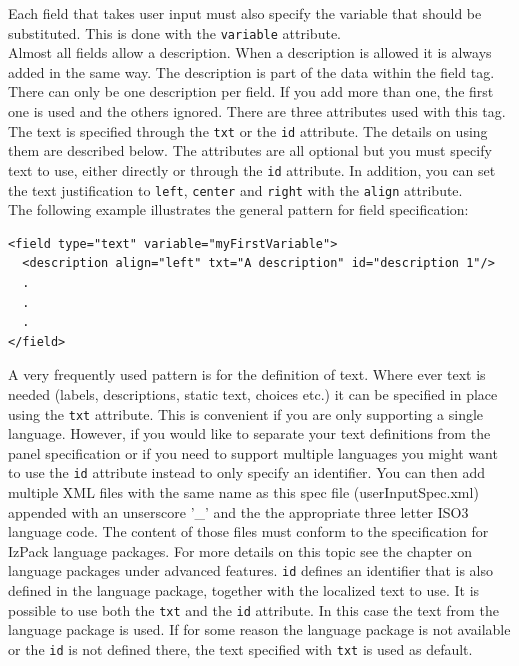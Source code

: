 Each field that takes user input must also specify the variable that
should be substituted. This is done with the \texttt{variable}
attribute.\\

\label{userInput:descriptiontag}
Almost all fields allow a description. When a description is allowed it
is always added in the same way. The description is part of the data
within the field tag. There can only be one description per field. If
you add more than one, the first one is used and the others ignored.
There are three attributes used with this tag. The text is specified
through the \texttt{txt} or the \texttt{id} attribute. The details on
using them are described below. The attributes are all optional but you
must specify text to use, either directly or through the \texttt{id}
attribute. In addition, you can set the text justification to
\texttt{left}, \texttt{center} and \texttt{right} with the
\texttt{align} attribute. \\

The following example illustrates the general pattern for field specification:\\

\footnotesize
\begin{verbatim}
<field type="text" variable="myFirstVariable">
  <description align="left" txt="A description" id="description 1"/>
  .
  .
  .
</field>
\end{verbatim}
\normalsize

A very frequently used pattern is for the definition of text. Where ever
text is needed (labels, descriptions, static text, choices etc.) it can
be specified in place using the \texttt{txt} attribute. This is
convenient if you are only supporting a single language. However, if you
would like to separate your text definitions from the panel
specification or if you need to support multiple languages you might
want to use the \texttt{id} attribute instead to only specify an
identifier. You can then add multiple XML files with the same name as
this spec file (userInputSpec.xml) appended with an unserscore '\_' and
the the appropriate three letter ISO3 language code. The content of
those files must conform to the specification for IzPack language
packages. For more details on this topic see the chapter on language
packages under advanced features. \texttt{id} defines an identifier that
is also defined in the language package, together with the localized
text to use. It is possible to use both the \texttt{txt} and the
\texttt{id} attribute. In this case the text from the language package
is used. If for some reason the language package is not available or the
\texttt{id} is not defined there, the text specified with \texttt{txt}
is used as default.\\

